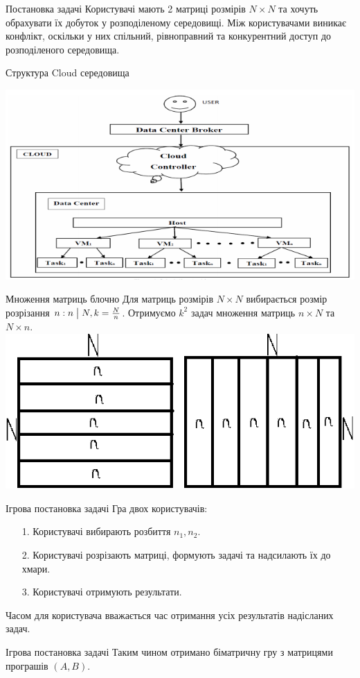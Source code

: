 \begin{frame}{Постановка задачі}
	\manimate
	Користувачі мають 2 матриці розмірів $N \times N$ та хочуть обрахувати їх добуток у розподіленому середовищі.
	Між користувачами виникає конфлікт, оскільки у них спільний, рівноправний та конкурентний доступ до розподіленого середовища. 
\end{frame}

\begin{frame}{Структура Cloud середовища}
	\manimate
	
	\includegraphics[width=1.0\linewidth]{im/cloud_representation}
\end{frame}

\begin{frame}{Множення матриць блочно}
	\manimate
	Для матриць розмірів $N \times N$ вибирається розмір розрізання $n: n \bigm| N, k = \frac{N}{n}$. Отримуємо $k^2$ задач множення матриць $n \times N$ та $N \times n$.
	\includegraphics[width=0.8\linewidth]{im/matrixmatrix}
\end{frame}

\begin{frame}{Ігрова постановка задачі}
\manimate
	Гра двох користувачів:
	\begin{itemize}
		\item[1.] Користувачі вибирають розбиття $n_1, n_2$.
		\item[2.] Користувачі розрізають матриці, формують задачі та надсилають їх до хмари.
		\item[3.] Користувачі отримують результати.
	\end{itemize}
	Часом для користувача вважається час отримання усіх результатів надісланих задач.
\end{frame}

\begin{frame}{Ігрова постановка задачі}
\manimate
	Таким чином отримано біматричну гру з матрицями програшів $(A,B)$.
\end{frame}